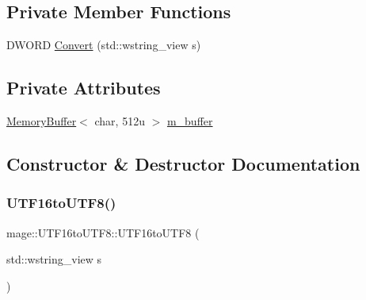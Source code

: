 \subsection*{Private Member Functions}
\begin{DoxyCompactItemize}
\item 
D\+W\+O\+RD \mbox{\hyperlink{classmage_1_1_u_t_f16to_u_t_f8_a0885fb6522d14378cc88ec1a9b0254e0}{Convert}} (std\+::wstring\+\_\+view s)
\end{DoxyCompactItemize}
\subsection*{Private Attributes}
\begin{DoxyCompactItemize}
\item 
\mbox{\hyperlink{classmage_1_1_memory_buffer}{Memory\+Buffer}}$<$ char, 512u $>$ \mbox{\hyperlink{classmage_1_1_u_t_f16to_u_t_f8_ae4975c52c3be2f500b7da56684d86bfd}{m\+\_\+buffer}}
\end{DoxyCompactItemize}


\subsection{Constructor \& Destructor Documentation}
\mbox{\label{classmage_1_1_u_t_f16to_u_t_f8_acdf4f119c0754032fe913c2673a97c17}} 
\subsubsection{\texorpdfstring{U\+T\+F16to\+U\+T\+F8()}{UTF16toUTF8()}\hspace{0.1cm}{\footnotesize\ttfamily [1/3]}}
{\footnotesize\ttfamily mage\+::\+U\+T\+F16to\+U\+T\+F8\+::\+U\+T\+F16to\+U\+T\+F8 (\begin{DoxyParamCaption}\item[{std\+::wstring\+\_\+view}]{s }\end{DoxyParamCaption})\hspace{0.3cm}{\ttfamily [explicit]}}

\mbox{\label{classmage_1_1_u_t_f16to_u_t_f8_ae26eb9ec3ee4b82dce91ea8673ed5c11}} 
